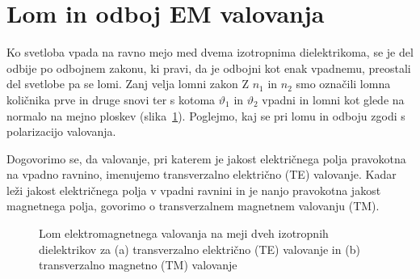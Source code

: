 \section{Lom in odboj EM valovanja}
Ko svetloba vpada na ravno mejo med dvema izotropnima dielektrikoma, se je 
del odbije po odbojnem zakonu, ki pravi, da je odbojni kot enak vpadnemu, 
preostali del svetlobe pa se lomi. Zanj velja lomni zakon
Z $n_{1}$ in $n_{2}$ smo označili lomna količnika prve in druge snovi ter
s kotoma $\vartheta_{1}$ in $\vartheta_{2}$ vpadni in lomni
kot glede na normalo na mejno ploskev (slika~\ref{fig:Lom}).
Poglejmo, kaj se pri lomu in odboju zgodi s polarizacijo valovanja.

Dogovorimo se, da valovanje, pri katerem je jakost električnega polja pravokotna 
na vpadno ravnino, imenujemo transverzalno električno (TE) 
valovanje. Kadar leži jakost električnega polja v
vpadni ravnini in je nanjo pravokotna jakost magnetnega polja,
govorimo o transverzalnem magnetnem valovanju (TM).
\begin{figure}[ht]
\centering {} 
  
\caption{Lom elektromagnetnega valovanja na meji dveh izotropnih dielektrikov za (a)
trans\-ver\-zal\-no električno (TE) valovanje in (b) trans\-ver\-zal\-no magnetno (TM) valovanje}
\label{fig:Lom}
\end{figure}

